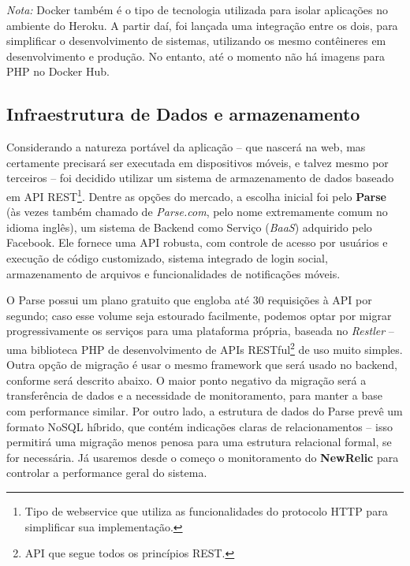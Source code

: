 \documentclass[12pt,a4paper,twoside,hyphens,english,brazil]{abntex2}
\begin{document}
{\begin{framed}
	\textit{Nota:} Docker também é o tipo de tecnologia utilizada para isolar aplicações no ambiente do Heroku. A partir daí, foi lançada uma integração entre os dois, para simplificar o desenvolvimento de sistemas, utilizando os mesmo contêineres em desenvolvimento e produção.\cite{heroku-docker} No entanto, até o momento não há imagens para PHP no Docker Hub\cite{heroku-dockerhub}.
\end{framed}

\subsection{Infraestrutura de Dados e armazenamento}
Considerando a natureza portável da aplicação -- que nascerá na web, mas certamente precisará ser executada em dispositivos móveis, e talvez mesmo por terceiros -- foi decidido utilizar um sistema de armazenamento de dados baseado em API REST\footnote{Tipo de webservice que utiliza as funcionalidades do protocolo HTTP para simplificar sua implementação.}. Dentre as opções do mercado, a escolha inicial foi pelo \textbf{Parse} (às vezes também chamado de \emph{Parse.com}, pelo nome extremamente comum no idioma inglês), um sistema de Backend como Serviço (\textit{BaaS}) adquirido pelo Facebook\cite{facebook-buys-parse}. Ele fornece uma API robusta, com controle de acesso por usuários e execução de código customizado, sistema integrado de login social, armazenamento de arquivos e funcionalidades de notificações móveis.

O Parse possui um plano gratuito que engloba até 30 requisições à API por segundo\cite{parse-plans}; caso esse volume seja estourado facilmente, podemos optar por migrar progressivamente os serviços para uma plataforma própria, baseada no \emph{Restler} -- uma biblioteca PHP de desenvolvimento de APIs RESTful\footnote{API que segue todos os princípios REST.} de uso muito simples. Outra opção de migração é usar o mesmo framework que será usado no backend, conforme será descrito abaixo. O maior ponto negativo da migração será a transferência de dados e a necessidade de monitoramento, para manter a base com performance similar. Por outro lado, a estrutura de dados do Parse prevê um formato NoSQL híbrido, que contém indicações claras de relacionamentos -- isso permitirá uma migração menos penosa para uma estrutura relacional formal, se for necessária. Já usaremos desde o começo o monitoramento do \textbf{NewRelic} para controlar a performance geral do sistema.

}
\end{document}
